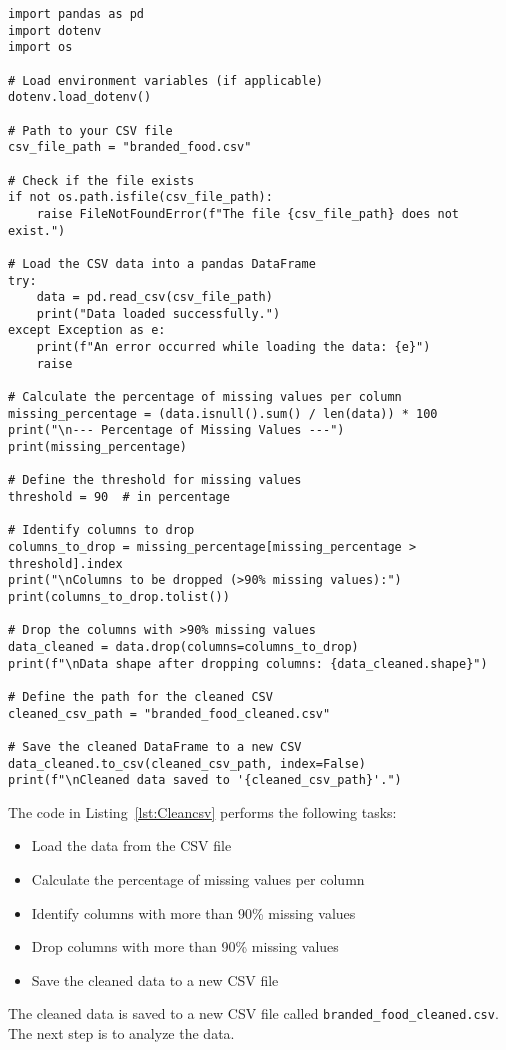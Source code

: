 \documentclass{article}
\begin{document}
\begin{lstlisting}[caption={Clean the CSV}, label={lst:Cleancsv}]
import pandas as pd
import dotenv
import os

# Load environment variables (if applicable)
dotenv.load_dotenv()

# Path to your CSV file
csv_file_path = "branded_food.csv"

# Check if the file exists
if not os.path.isfile(csv_file_path):
    raise FileNotFoundError(f"The file {csv_file_path} does not exist.")

# Load the CSV data into a pandas DataFrame
try:
    data = pd.read_csv(csv_file_path)
    print("Data loaded successfully.")
except Exception as e:
    print(f"An error occurred while loading the data: {e}")
    raise

# Calculate the percentage of missing values per column
missing_percentage = (data.isnull().sum() / len(data)) * 100
print("\n--- Percentage of Missing Values ---")
print(missing_percentage)

# Define the threshold for missing values
threshold = 90  # in percentage

# Identify columns to drop
columns_to_drop = missing_percentage[missing_percentage > threshold].index
print("\nColumns to be dropped (>90% missing values):")
print(columns_to_drop.tolist())

# Drop the columns with >90% missing values
data_cleaned = data.drop(columns=columns_to_drop)
print(f"\nData shape after dropping columns: {data_cleaned.shape}")

# Define the path for the cleaned CSV
cleaned_csv_path = "branded_food_cleaned.csv"

# Save the cleaned DataFrame to a new CSV
data_cleaned.to_csv(cleaned_csv_path, index=False)
print(f"\nCleaned data saved to '{cleaned_csv_path}'.")
\end{lstlisting}

The code in Listing~\ref{lst:Cleancsv} performs the following tasks:
  \begin{itemize}
      \item Load the data from the CSV file
      \item Calculate the percentage of missing values per column
      \item Identify columns with more than 90\% missing values
      \item Drop columns with more than 90\% missing values
      \item Save the cleaned data to a new CSV file
  \end{itemize}
The cleaned data is saved to a new CSV file called \texttt{branded\_food\_cleaned.csv}. The next step is to analyze the data. 
\end{document}
